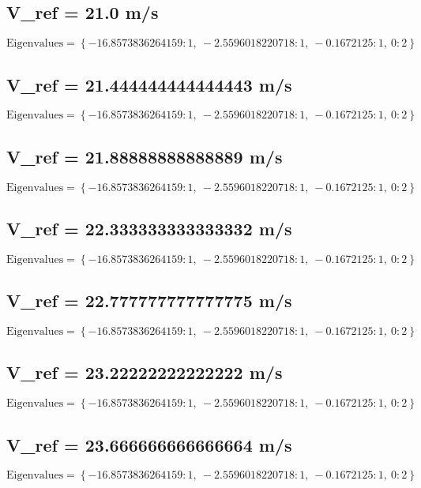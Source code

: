 \documentclass{article}
\begin{document}
\subsection*{V_ref = 21.0 m/s}
\begin{equation}
\text{Eigenvalues} = \left\{ -16.8573836264159 : 1, \  -2.5596018220718 : 1, \  -0.1672125 : 1, \  0 : 2\right\}
\end{equation}
\subsection*{V_ref = 21.444444444444443 m/s}
\begin{equation}
\text{Eigenvalues} = \left\{ -16.8573836264159 : 1, \  -2.5596018220718 : 1, \  -0.1672125 : 1, \  0 : 2\right\}
\end{equation}
\subsection*{V_ref = 21.88888888888889 m/s}
\begin{equation}
\text{Eigenvalues} = \left\{ -16.8573836264159 : 1, \  -2.5596018220718 : 1, \  -0.1672125 : 1, \  0 : 2\right\}
\end{equation}
\subsection*{V_ref = 22.333333333333332 m/s}
\begin{equation}
\text{Eigenvalues} = \left\{ -16.8573836264159 : 1, \  -2.5596018220718 : 1, \  -0.1672125 : 1, \  0 : 2\right\}
\end{equation}
\subsection*{V_ref = 22.777777777777775 m/s}
\begin{equation}
\text{Eigenvalues} = \left\{ -16.8573836264159 : 1, \  -2.5596018220718 : 1, \  -0.1672125 : 1, \  0 : 2\right\}
\end{equation}
\subsection*{V_ref = 23.22222222222222 m/s}
\begin{equation}
\text{Eigenvalues} = \left\{ -16.8573836264159 : 1, \  -2.5596018220718 : 1, \  -0.1672125 : 1, \  0 : 2\right\}
\end{equation}
\subsection*{V_ref = 23.666666666666664 m/s}
\begin{equation}
\text{Eigenvalues} = \left\{ -16.8573836264159 : 1, \  -2.5596018220718 : 1, \  -0.1672125 : 1, \  0 : 2\right\}
\end{equation}
\end{document}

